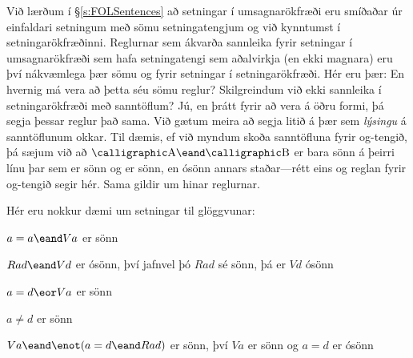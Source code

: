 Við lærðum í \S\ref{s:FOLSentences} að setningar í umsagnarökfræði eru smíðaðar úr einfaldari setningum með sömu setningatengjum og við kynntumst í setningarökfræðinni. Reglurnar sem ákvarða sannleika fyrir setningar í umsagnarökfræði sem hafa setningatengi sem aðalvirkja (en ekki magnara) eru því nákvæmlega þær sömu og fyrir setningar í setningarökfræði. Hér eru þær:
En hvernig má vera að þetta séu sömu reglur? Skilgreindum við ekki sannleika í setningarökfræði með sanntöflum? Jú, en þrátt fyrir að vera á öðru formi, þá segja þessar reglur það sama. Við gætum meira að segja litið á þær sem \emph{lýsingu} á sanntöflunum okkar. Til dæmis, ef við myndum skoða sanntöfluna fyrir og-tengið, þá sæjum við að $\meta{A} \eand \meta{B}$ er bara sönn á þeirri línu þar sem  er sönn og  er sönn, en ósönn annars staðar---rétt eins og reglan fyrir og-tengið segir hér. Sama gildir um hinar reglurnar.

Hér eru nokkur dæmi um setningar til glöggvunar:
	
	\begin{earg}
		\item[\textbullet] $a = a \eand Va$ er sönn
		\item[\textbullet] $Rad \eand Vd$ er ósönn, því jafnvel þó $Rad$ sé sönn, þá er $Vd$ ósönn
		\item[\textbullet] $a = d \eor Va$ er sönn
		\item[\textbullet] $a \neq d$ er sönn
		\item[\textbullet] $Va \eand \enot( a= d \eand Rad)$ er sönn, því $Va$ er sönn og $a = d$ er ósönn
	\end{earg}

